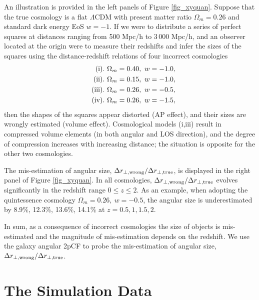 \documentclass[iop]{emulateapj}
\begin{document}
An illustration is provided in the left panels of Figure \ref{fig_xyquan}.
Suppose that the true cosmology is a flat $\Lambda$CDM with present matter ratio $\Omega_m=0.26$
and standard dark energy EoS $w=-1$.
If we were to distribute a series of perfect squares at distances ranging from 500 Mpc/h to 3\,000 Mpc/h,
and an observer located at the origin were to measure their redshifts and infer the sizes of the squares
using the distance-redshift relations of four incorrect cosmologies
\begin{eqnarray}
 & &{\rm (i)}.\ \Omega_m=0.40,\ w=-1.0, \nonumber \\ 
 & &{\rm (ii)}.\ \Omega_m=0.15,\ w=-1.0, \nonumber\\ \noindent
 & &{\rm (iii)}.\ \Omega_m=0.26,\ w=-0.5,\nonumber\\ \noindent
 & &{\rm (iv)}.\ \Omega_m=0.26,\ w=-1.5,  \nonumber \noindent 
\end{eqnarray}
then the shapes of the squares appear distorted (AP effect),
and their sizes are wrongly estimated (volume effect).
Cosmological models (i,iii) result in compressed volume elements (in both angular and LOS direction),
and the degree of compression increases with increasing distance;
the situation is opposite for the other two cosmologies.

The mis-estimation of angular size, ${\Delta r_{\perp, \rm wrong}}/{\Delta r_{\perp, \rm true}}$, 
is displayed in the right panel of Figure \ref{fig_xyquan}.
In all cosmologies, ${\Delta r_{\perp, \rm wrong}}/{\Delta r_{\perp, \rm true}}$ evolves significantly in the redshift range $0\leq z\leq 2$.
As an example, when adopting the quintessence cosmology $\Omega_m=0.26,\ w=-0.5$,
the angular size is underestimated by 
8.9\%, 12.3\%, 13.6\%, 14.1\% 
at $z=0.5,1,1.5,2$.


In sum, as a consequence of incorrect cosmologies 
the size of objects is mis-estimated and the magnitude of mis-estimation depends on the redshift.
We use the galaxy angular 2pCF to probe the mis-estimation of angular size, ${\Delta r_{\perp, \rm wrong}}/{\Delta r_{\perp, \rm true}}$.


\section{The Simulation Data}\label{sec:data}
\end{document}
